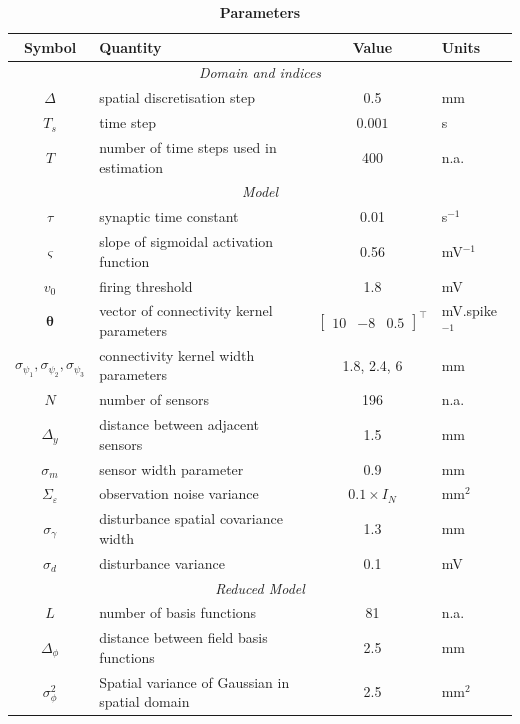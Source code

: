\documentclass[12pt]{iopart}
\begin{document}
\begin{table}[!ht]
\caption{
\bf{Parameters}}
\begin{tabular}{|c|l|c|l|}
	\hline
	\textbf{Symbol} & \textbf{Quantity} & \textbf{Value} & \textbf{Units}\\
	\hline
	\multicolumn{4}{|c|}{\emph{Domain and indices}}\\
	\hline
	$\Delta$ & spatial discretisation step & 0.5 & mm \\
	$T_s$ & time step & $0.001$ & s\\
	$T$ & number of time steps used in estimation & 400 & n.a.\\
	\hline 
\multicolumn{4}{|c|}{\emph{Model}}\\
	\hline
	$\tau$ & synaptic time constant & 0.01 & s$^{-1}$ \\
	$\varsigma$ & slope of sigmoidal activation function & 0.56 & mV$^{-1}$\\
	$v_0$ & firing threshold & 1.8 & mV \\
	$\boldsymbol{\theta}$ & vector of connectivity kernel parameters & $\left[\begin{array}{ccc}
	10 &-8 &0.5
	\end{array}
	\right]^{\top}$ & mV.spike$^{-1}$\\
	$\sigma_{\psi_{1}}, \sigma_{\psi_{2}}, \sigma_{\psi_{3}}$ & connectivity kernel width parameters & 1.8, 2.4, 6 & mm\\
	$N$ & number of sensors & 196 & n.a.\\ 
	$\Delta_y$ & distance between adjacent sensors & 1.5 & mm\\
	$\sigma_{m}$ & sensor width parameter & 0.9 & mm \\
	$\Sigma_{\varepsilon}$ & observation noise variance & $0.1 \times I_{N}$ & mm$^2$ \\
	$\sigma_{\gamma}$& disturbance spatial covariance width & 1.3 & mm\\
	$\sigma_{d}$ & disturbance variance & 0.1 & mV \\
	\hline 
	\multicolumn{4}{|c|}{\emph{Reduced Model}}\\
	\hline
	$L$ & number of basis functions& 81 & n.a.\\
	$\Delta_{\phi}$ & distance between field basis functions & 2.5 & mm \\
	$\sigma^2_{\phi}$ & Spatial variance of Gaussian in spatial domain & 2.5 & mm$^2$\\
	\hline 

\end{tabular}
\end{table}
\end{document}
